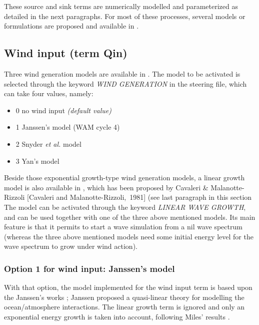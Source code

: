 These source and sink terms are numerically modelled and parameterized as detailed in the next paragraphs. For most of these processes, several models or formulations are proposed and available in \tomawac.


\subsection{ Wind input (term Qin)}
\label{WIND_INPUT}

 Three wind generation models are available in \tomawac. The model to be activated is selected through the keyword \textit{WIND GENERATION} in the steering file, which can take four values, namely:

\begin{itemize}
\item  0 no wind input \textit{(default value)}
\item  1 Janssen's model \cite{Janssen1989} \cite{Janssen1991} (WAM cycle 4)%
\item  2 Snyder \textit{et al. }model \cite{Snyder1981} %
\item  3 Yan's model \cite{Yan1987}%
\end{itemize}

Beside those exponential growth-type wind generation models, a linear growth model is also available in \tomawac, which has been proposed by Cavaleri \& Malanotte-Rizzoli [Cavaleri and Malanotte-Rizzoli,~1981] (see last paragraph in this section %
The model can be activated through the keyword \textit{LINEAR WAVE GROWTH}, and can be used together with one of the three above mentioned models. Its main feature is that it permits to start a wave simulation from a nil wave spectrum (whereas the three above mentioned models need some initial energy level for the wave spectrum to grow under wind action).


  \subsubsection{Option 1 for wind input: Janssen's model}
\label{parag4.3.2.1}
 With that option, the model implemented for the wind input term is based upon the Janssen's works \cite{Janssen1989} \cite{Janssen1991}; Janssen proposed a quasi-linear theory for modelling the ocean/atmosphere interactions. The linear growth term is ignored and only an exponential energy growth is taken into account, following Miles' results \cite{Miles1957}.

